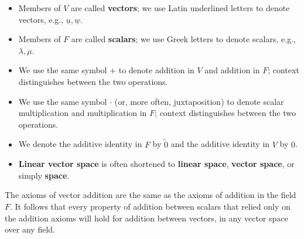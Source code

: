\begin{notation}
    \begin{itemize}
        \item Members of $V$ are called \textbf{vectors}; we use Latin underlined letters to denote vectors, e.g., $\underline{u}, \underline{w}$.
        \item Members of $F$ are called \textbf{scalars}; we use Greek letters to denote scalars, e.g., $\lambda, \mu$.
        \item We use the same symbol $+$ to denote addition in $V$ and addition in $F$; context distinguishes between the two operations.
        \item We use the same symbol $\cdot$ (or, more often, juxtaposition) to denote scalar multiplication and multiplication in $F$; context distinguishes between the two operations.
        \item We denote the additive identity in $F$ by $\tilde{0}$ and the additive identity in $V$ by $0$.
        \item \textbf{Linear vector space} is often shortened to \textbf{linear space}, \textbf{vector space}, or simply \textbf{space}.
    \end{itemize}
\end{notation}

\begin{note}
    The axioms of vector addition are the same as the axioms of addition in the field $F$. It follows that every property of addition between scalars that relied only on the addition axioms will hold for addition between vectors, in any vector space over any field.
\end{note}
